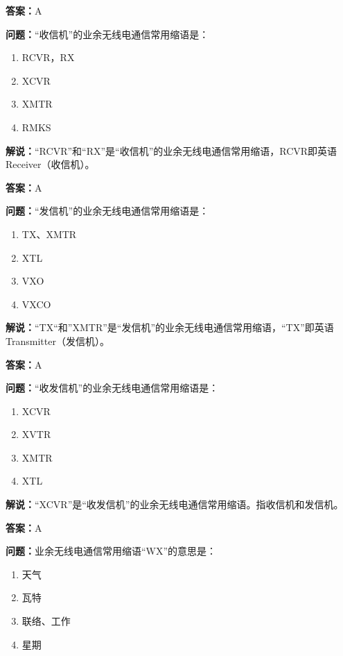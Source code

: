\documentclass[UTF8]{ctexbook}
\begin{document}
\textbf{答案：}A

\textbf{问题：}“收信机”的业余无线电通信常用缩语是：

\begin{enumerate}[label=\Alph*), leftmargin=3em]
  \item RCVR，RX
  \item XCVR
  \item XMTR
  \item RMKS
\end{enumerate}

\textbf{解说：}“RCVR”和“RX”是“收信机”的业余无线电通信常用缩语，RCVR即英语Receiver（收信机）。

\textbf{答案：}A

\textbf{问题：}“发信机”的业余无线电通信常用缩语是：

\begin{enumerate}[label=\Alph*), leftmargin=3em]
  \item TX、XMTR
  \item XTL
  \item VXO
  \item VXCO
\end{enumerate}

\textbf{解说：}“TX“和”XMTR”是“发信机”的业余无线电通信常用缩语，“TX”即英语Transmitter（发信机）。

\textbf{答案：}A

\textbf{问题：}“收发信机”的业余无线电通信常用缩语是：

\begin{enumerate}[label=\Alph*), leftmargin=3em]
  \item XCVR
  \item XVTR
  \item XMTR
  \item XTL
\end{enumerate}

\textbf{解说：}“XCVR”是“收发信机”的业余无线电通信常用缩语。指收信机和发信机。

\textbf{答案：}A

\textbf{问题：}业余无线电通信常用缩语“WX”的意思是：

\begin{enumerate}[label=\Alph*), leftmargin=3em]
  \item 天气
  \item 瓦特
  \item 联络、工作
  \item 星期
\end{enumerate}
\end{document}
